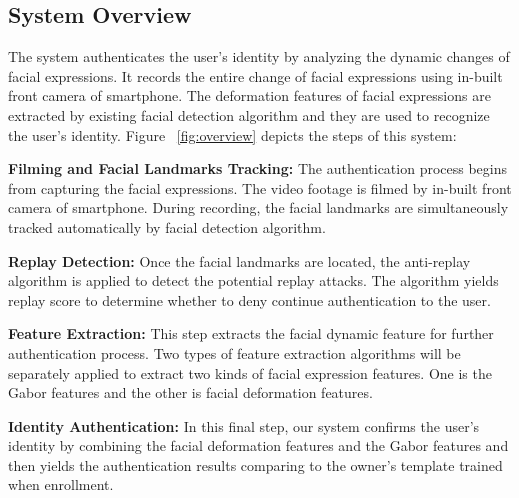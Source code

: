     \subsection{System Overview}
        The system authenticates the user's identity by analyzing the dynamic changes of facial expressions. It records the entire change of facial expressions using in-built front camera of smartphone. The deformation features of facial expressions are extracted by existing facial detection algorithm and they are used to recognize the user's identity.
        Figure ~\ref{fig:overview} depicts the steps of this system:

        \noindent {} \textbf{Filming and Facial Landmarks Tracking:} The authentication process begins from capturing the facial expressions. The video footage is filmed by in-built front camera of smartphone. During recording, the facial landmarks are simultaneously tracked automatically by facial detection algorithm.
        
        \noindent {} \textbf{Replay Detection:} Once the facial landmarks are located, the anti-replay algorithm is applied to detect the potential replay attacks. The algorithm yields replay score to determine whether to deny continue authentication to the user.

        \noindent {} \textbf{Feature Extraction:} This step extracts the facial dynamic feature for further authentication process. Two types of feature extraction algorithms will be separately applied to extract two kinds of facial expression features. One is the Gabor features and the other is facial deformation features.

        \noindent {} \textbf{Identity Authentication:} In this final step, our system confirms the user's identity by combining the facial deformation features and the Gabor features and then yields the authentication results comparing to the owner's template trained when enrollment.

